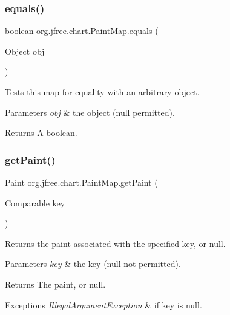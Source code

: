 \subsubsection{\texorpdfstring{equals()}{equals()}}
{\footnotesize\ttfamily boolean org.\+jfree.\+chart.\+Paint\+Map.\+equals (\begin{DoxyParamCaption}\item[{Object}]{obj }\end{DoxyParamCaption})}

Tests this map for equality with an arbitrary object.


\begin{DoxyParams}{Parameters}
{\em obj} & the object ({\ttfamily null} permitted).\\
\hline
\end{DoxyParams}
\begin{DoxyReturn}{Returns}
A boolean. 
\end{DoxyReturn}
\mbox{\label{classorg_1_1jfree_1_1chart_1_1_paint_map_af22525235cd7efae3a417da12999dd8f}} 
\subsubsection{\texorpdfstring{get\+Paint()}{getPaint()}}
{\footnotesize\ttfamily Paint org.\+jfree.\+chart.\+Paint\+Map.\+get\+Paint (\begin{DoxyParamCaption}\item[{Comparable}]{key }\end{DoxyParamCaption})}

Returns the paint associated with the specified key, or {\ttfamily null}.


\begin{DoxyParams}{Parameters}
{\em key} & the key ({\ttfamily null} not permitted).\\
\hline
\end{DoxyParams}
\begin{DoxyReturn}{Returns}
The paint, or {\ttfamily null}.
\end{DoxyReturn}

\begin{DoxyExceptions}{Exceptions}
{\em Illegal\+Argument\+Exception} & if {\ttfamily key} is {\ttfamily null}. \\
\hline
\end{DoxyExceptions}
\mbox{\label{classorg_1_1jfree_1_1chart_1_1_paint_map_a0859d8456587840dd23ee6ff7de44dac}} 
